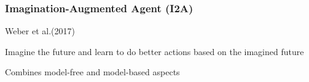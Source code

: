 








\PraesentationMasterWeissBlau 
\begin{frame} 

\end{frame} 

\PraesentationMasterStandard


\begin{frame}
    \frametitle{Imagination-Augmented Agent (I2A)}

\begin{PraesentationAufzaehlung}
	\item Weber et al.(2017)
    \item Imagine the future and learn to do better actions based on the imagined future
    \item Combines model-free and model-based aspects
\end{PraesentationAufzaehlung}

\end{frame}
\clearpage

